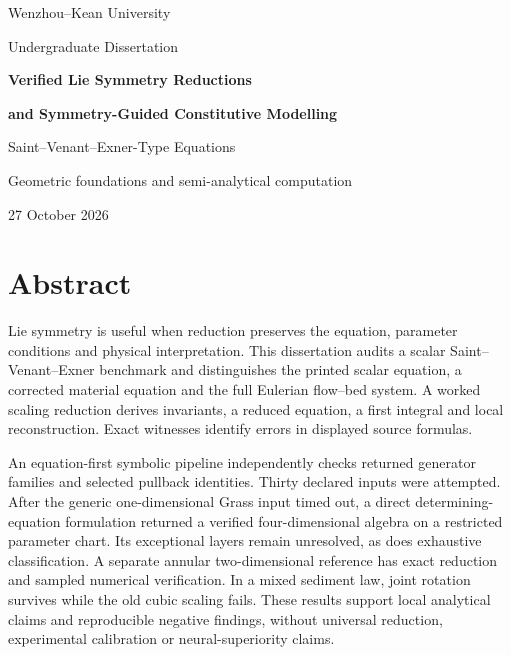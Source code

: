 \documentclass[11pt,a4paper,oneside]{report}
\numberwithin{equation}{chapter}
\begin{document}
\begin{titlepage}
\centering
{\large Wenzhou--Kean University\par}
\vspace{12mm}
{\large Undergraduate Dissertation\par}
\vspace{25mm}
{\LARGE\bfseries Verified Lie Symmetry Reductions\par}
\vspace{4mm}
{\LARGE\bfseries and Symmetry-Guided Constitutive Modelling\par}
\vspace{10mm}
{\Large Saint--Venant--Exner-Type Equations\par}
\vspace{15mm}
{\large Geometric foundations and semi-analytical computation\par}
\vfill
{\large 27 October 2026\par}
\end{titlepage}
\graphicspath{{draft/figures/final-20261027/}{figures/final-20261027/}}
\chapter*{Abstract}
Lie symmetry is useful when reduction preserves the equation, parameter conditions and physical interpretation. This dissertation audits a scalar Saint--Venant--Exner benchmark and distinguishes the printed scalar equation, a corrected material equation and the full Eulerian flow--bed system. A worked scaling reduction derives invariants, a reduced equation, a first integral and local reconstruction. Exact witnesses identify errors in displayed source formulas.

An equation-first symbolic pipeline independently checks returned generator families and selected pullback identities. Thirty declared inputs were attempted. After the generic one-dimensional Grass input timed out, a direct determining-equation formulation returned a verified four-dimensional algebra on a restricted parameter chart. Its exceptional layers remain unresolved, as does exhaustive classification. A separate annular two-dimensional reference has exact reduction and sampled numerical verification. In a mixed sediment law, joint rotation survives while the old cubic scaling fails. These results support local analytical claims and reproducible negative findings, without universal reduction, experimental calibration or neural-superiority claims.
\tableofcontents\clearpage{}
\end{document}
